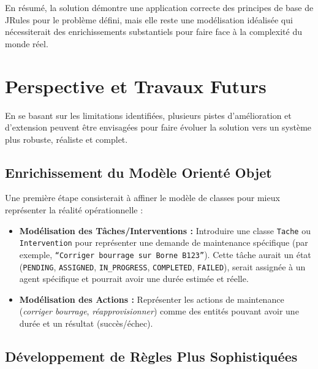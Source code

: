 \documentclass[11pt,a4paper]{article}
\begin{document}
En résumé, la solution démontre une application correcte des principes de base de JRules pour le problème défini, mais elle reste une modélisation idéalisée qui nécessiterait des enrichissements substantiels pour faire face à la complexité du monde réel.

\section{Perspective et Travaux Futurs}
\label{sec:perspective}

En se basant sur les limitations identifiées, plusieurs pistes d'amélioration et d'extension peuvent être envisagées pour faire évoluer la solution vers un système plus robuste, réaliste et complet.

\subsection{Enrichissement du Modèle Orienté Objet}

Une première étape consisterait à affiner le modèle de classes pour mieux représenter la réalité opérationnelle :
\begin{itemize}
  \item \textbf{Modélisation des Tâches/Interventions :}
    Introduire une classe \texttt{Tache} ou \texttt{Intervention}
    pour représenter une demande de maintenance spécifique
    (par exemple, \texttt{“Corriger bourrage sur Borne B123”}).
    Cette tâche aurait un état
    (\texttt{PENDING}, \texttt{ASSIGNED}, \texttt{IN\_PROGRESS},
    \texttt{COMPLETED}, \texttt{FAILED}), serait assignée à un agent
    spécifique et pourrait avoir une durée estimée et réelle.
  \item \textbf{Modélisation des Actions :}
    Représenter les actions de maintenance
    (\emph{corriger bourrage}, \emph{réapprovisionner}) comme des
    entités pouvant avoir une durée et un résultat (succès/échec).
\end{itemize}


\subsection{Développement de Règles Plus Sophistiquées}
\end{document}
